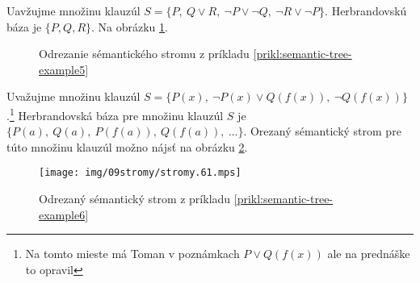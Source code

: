 \begin{priklad}
    \label{prikl:semantic-tree-example5}
    Uavžujme množinu klauzúl
    $S= \{ P,\ Q \lor R,\ \neg P \lor \neg Q,\ \neg R \lor \neg P \}$.
    Herbrandovskú báza je $\{P, Q, R\}$. Na obrázku
    \ref{fig:semantic-tree-example5}.

    \begin{figure}[h]
        \centering
        \caption{Odrezanie sémantického stromu z príkladu
                \ref{prikl:semantic-tree-example5}}
        \label{fig:semantic-tree-example5}
    \end{figure}
\end{priklad}



\begin{priklad}
    \label{prikl:semantic-tree-example6}
    Uvažujme množinu klauzúl $S=\{ P(x),\ \neg P(x) \lor Q(f(x)),\ \neg Q(f(x)) \}$.\footnote{
        Na tomto mieste má Toman v poznámkach $P \lor Q(f(x))$ ale na
        prednáške to opravil}
    Herbrandovská báza pre množinu klauzúl $S$ je
    $\{ P(a),\ Q(a),\ P(f(a)),\ Q(f(a)),\ \ldots \}$. Orezaný sémantický
    strom pre túto množinu klauzúl možno nájsť na obrázku
    \ref{fig:semantic-tree-example6}.

    \begin{figure}[h]
        \centering
        \texttt{[image: img/09stromy/stromy.61.mps]}
        \caption{Odrezaný sémantický strom z príkladu
                \ref{prikl:semantic-tree-example6}}
        \label{fig:semantic-tree-example6}
    \end{figure}
\end{priklad}


